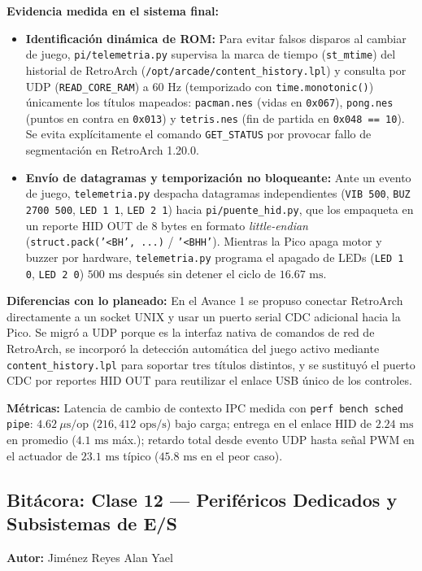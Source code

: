 \textbf{Evidencia medida en el sistema final:}
\begin{itemize}
	\item \textbf{Identificación dinámica de ROM:} Para evitar falsos disparos al cambiar de juego, \texttt{pi/telemetria.py} supervisa la marca de tiempo (\texttt{st\_mtime}) del historial de RetroArch (\texttt{/opt/arcade/content\_history.lpl}) y consulta por UDP (\texttt{READ\_CORE\_RAM}) a $60\text{ Hz}$ (temporizado con \texttt{time.monotonic()}) únicamente los títulos mapeados: \texttt{pacman.nes} (vidas en \texttt{0x067}), \texttt{pong.nes} (puntos en contra en \texttt{0x013}) y \texttt{tetris.nes} (fin de partida en \texttt{0x048 == 10}). Se evita explícitamente el comando \texttt{GET\_STATUS} por provocar fallo de segmentación en RetroArch 1.20.0.
	\item \textbf{Envío de datagramas y temporización no bloqueante:} Ante un evento de juego, \texttt{telemetria.py} despacha datagramas independientes (\texttt{VIB 500}, \texttt{BUZ 2700 500}, \texttt{LED 1 1}, \texttt{LED 2 1}) hacia \texttt{pi/puente\_hid.py}, que los empaqueta en un reporte HID OUT de 8 bytes en formato \textit{little-endian} (\texttt{struct.pack('<BH', ...)} / \texttt{'<BHH'}). Mientras la Pico apaga motor y buzzer por hardware, \texttt{telemetria.py} programa el apagado de LEDs (\texttt{LED 1 0}, \texttt{LED 2 0}) $500\text{ ms}$ después sin detener el ciclo de $16.67\text{ ms}$.
\end{itemize}

\textbf{Diferencias con lo planeado:} En el Avance 1 se propuso conectar RetroArch directamente a un socket UNIX y usar un puerto serial CDC adicional hacia la Pico. Se migró a UDP porque es la interfaz nativa de comandos de red de RetroArch, se incorporó la detección automática del juego activo mediante \texttt{content\_history.lpl} para soportar tres títulos distintos, y se sustituyó el puerto CDC por reportes HID OUT para reutilizar el enlace USB único de los controles.

\textbf{Métricas:} Latencia de cambio de contexto IPC medida con \texttt{perf bench sched pipe}: $4.62~\mu\text{s/op}$ ($216{,}412\text{ ops/s}$) bajo carga; entrega en el enlace HID de $2.24\text{ ms}$ en promedio ($4.1\text{ ms}$ máx.); retardo total desde evento UDP hasta señal PWM en el actuador de $23.1\text{ ms}$ típico ($45.8\text{ ms}$ en el peor caso).

\subsection{Bitácora: Clase 12 — Periféricos Dedicados y Subsistemas de E/S}
\textbf{Autor:} Jiménez Reyes Alan Yael

